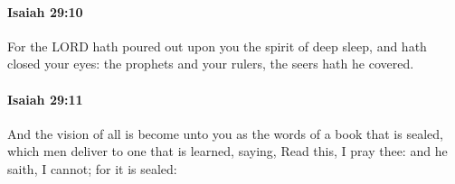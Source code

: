 		\paragraph{Isaiah 29:10} %
			\label{ISAIAH-29-10}

			For the LORD hath poured out upon you the spirit of deep sleep, and hath closed your eyes: the prophets and your rulers, the seers hath he covered.


		\paragraph{Isaiah 29:11} %
			\label{ISAIAH-29-11}

			And the vision of all is become unto you as the words of a book that is sealed, which men deliver to one that is learned, saying, Read this, I pray thee: and he saith, I cannot; for it is sealed:


